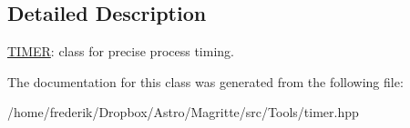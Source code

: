 \subsection{Detailed Description}
\mbox{\hyperlink{classTIMER}{T\+I\+M\+ER}}\+: class for precise process timing. 

The documentation for this class was generated from the following file\+:\begin{DoxyCompactItemize}
\item 
/home/frederik/\+Dropbox/\+Astro/\+Magritte/src/\+Tools/timer.\+hpp\end{DoxyCompactItemize}
